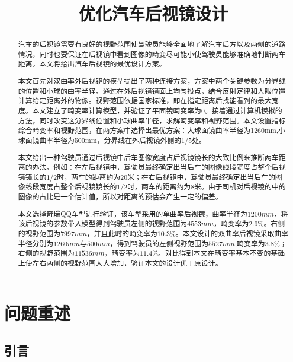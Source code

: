 \documentclass[bwprint]{cumcmthesis}
\title{优化汽车后视镜设计}
\begin{document}
 \maketitle
 \begin{abstract}
 \par 汽车的后视镜需要有良好的视野范围使驾驶员能够全面地了解汽车后方以及两侧的道路情况，同时也要保证在后视镜中看到图像的畸变尽可能小使驾驶员能够准确地判断两车距离。本文将给出汽车后视镜的最优设计方案。
\par 本文首先对双曲率外后视镜的模型提出了两种连接方案，方案中两个关键参数为分界线的位置和小球的曲率半径。通过在外后视镜镜面上均匀投点，结合反射定律和人眼位置计算给定距离外的物像。视野范围依据国家标准，即在指定距离后找能看到的最大宽度。本文建立了畸变率计算模型，并验证了平面镜畸变率为0。接着通过计算机模拟的方法，同时改变这分界线位置和小球曲率半径，求解畸变率和视野范围。本文设置指标综合畸变率和视野范围，在两方案中选择出最优方案：大球面镜曲率半径为1260mm,小球面镜曲率半径为500mm，分界线在外后视镜外侧的$1/5$处。
\par 本文给出一种驾驶员通过后视镜中后车图像宽度占后视镜镜长的大致比例来推断两车距离的办法。例如：在左后视镜中，驾驶员最终确定出当后车的图像线段宽度占整个后视镜镜长的$1/2$时，两车的距离约为20米；在右后视镜中，驾驶员最终确定出当后车的图像线段宽度占整个后视镜镜长的$1/2$时，两车的距离约为8米。由于司机对后视镜的中的图像的占比是一个估计值，所以对距离的预估会产生一定的偏差。
\par 本文选择奇瑞QQ车型进行验证，该车型采用的单曲率后视镜，曲率半径为$1200mm$，将该后视镜的参数带入模型得到驾驶员左侧的视野范围为$4553mm$，畸变率为$2.9\%$。右侧的视野范围为$7997mm$，并且此时的畸变率为$10.3\%$。本文设计的双曲率后视镜采取曲率半径分别为$1260mm$与$500mm$，得到驾驶员的左侧视野范围为$5527mm$,畸变率为$3.8\%$；右侧的视野范围为$11536mm$，畸变率为$11.4\%$。对比得到本文在畸变率基本不变的基础上使左右两侧的视野范围大大增加，验证本文的设计优于原设计。
 
\end{abstract}

\tableofcontents
\newpage

\section{问题重述}
 

\subsection{引言}
\end{document}
